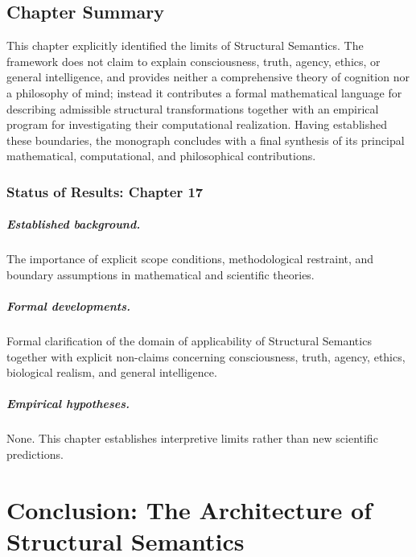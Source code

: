 \documentclass[11pt,twoside,openright]{book}
\numberwithin{equation}{chapter}
\theoremstyle{definition}
\theoremstyle{plain}
\theoremstyle{remark}
\theoremstyle{definition}
\begin{document}
\section{Chapter Summary}

This chapter explicitly identified the limits of Structural Semantics.
The framework does not claim to explain consciousness, truth, agency,
ethics, or general intelligence, and provides neither a comprehensive
theory of cognition nor a philosophy of mind; instead it contributes a
formal mathematical language for describing admissible structural
transformations together with an empirical program for investigating
their computational realization. Having established these boundaries, the
monograph concludes with a final synthesis of its principal mathematical,
computational, and philosophical contributions.

\subsection*{Status of Results: Chapter 17}

\paragraph{Established background.} The importance of explicit scope
conditions, methodological restraint, and boundary assumptions in
mathematical and scientific theories.

\paragraph{Formal developments.} Formal clarification of the domain of
applicability of Structural Semantics together with explicit non-claims
concerning consciousness, truth, agency, ethics, biological realism, and
general intelligence.

\paragraph{Empirical hypotheses.} None. This chapter establishes
interpretive limits rather than new scientific predictions.

\chapter{Conclusion: The Architecture of Structural Semantics}
\label{ch:conclusion}
\end{document}
